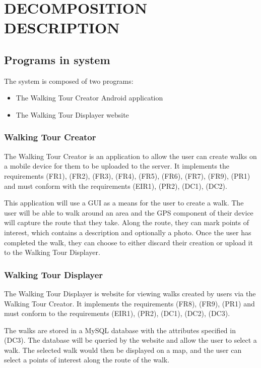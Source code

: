 \documentclass{project}
\begin{document}
\newpage

\section{DECOMPOSITION DESCRIPTION}
\subsection{Programs in system}
The system is composed of two programs:
\begin{itemize}
\item The Walking Tour Creator Android application
\item The Walking Tour Displayer website
\end{itemize}


\subsubsection{Walking Tour Creator}
The Walking Tour Creator is an application to allow the user can create walks
on a mobile device for them to be uploaded to the server. It implements the
requirements (FR1), (FR2), (FR3), (FR4), (FR5), (FR6), (FR7), (FR9), (PR1) and
must conform with the requirements (EIR1), (PR2), (DC1), (DC2).\cite{se.qa.rs}

This application will use a GUI as a means for the user to create a walk. The
user will be able to walk around an area and the GPS component of their device
will capture the route that they take. Along the route, they can mark points of
interest, which contains a description and optionally a photo. Once the user
has completed the walk, they can choose to either discard their creation or
upload it to the Walking Tour Displayer.

\subsubsection{Walking Tour Displayer}
The Walking Tour Displayer is website for viewing walks created by users via
the Walking Tour Creator. It implements the requirements (FR8), (FR9), (PR1)
and must conform to the requirements (EIR1), (PR2), (DC1), (DC2),
(DC3).\cite{se.qa.rs}

The walks are stored in a MySQL database with the attributes specified in
(DC3). The database will be queried by the website and allow the user to select
a walk. The selected walk would then be displayed on a map, and the user can
select a points of interest along the route of the walk.
\end{document}
